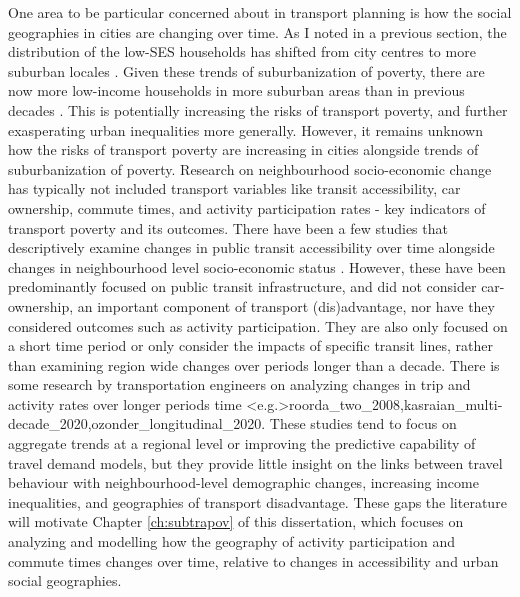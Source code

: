 One area to be particular concerned about in transport planning is how the social geographies in cities are changing over time. As I noted in a previous section, the distribution of the low-SES households has shifted from city centres to more suburban locales \cite{ehrenhalt_great_2012,ades_are_2012}. Given these trends of suburbanization of poverty, there are now more low-income households in more suburban areas than in previous decades \cite{ades_are_2012,ades_is_2016,breau_pulling_2018}. This is potentially increasing the risks of transport poverty, and further exasperating urban inequalities more generally. However, it remains unknown how the risks of transport poverty are increasing in cities alongside trends of suburbanization of poverty. Research on neighbourhood socio-economic change has typically not included transport variables like transit accessibility, car ownership, commute times, and activity participation rates - key indicators of transport poverty and its outcomes. There have been a few studies that descriptively examine changes in public transit accessibility over time alongside changes in neighbourhood level socio-economic status . However, these have been predominantly focused on public transit infrastructure, and did not consider car-ownership, an important component of transport (dis)advantage, nor have they considered outcomes such as activity participation. They are also only focused on a short time period or only consider the impacts of specific transit lines, rather than examining region wide changes over periods longer than a decade. There is some research by transportation engineers on analyzing changes in trip and activity rates over longer periods time \shortcite<e.g.>{roorda_two_2008,kasraian_multi-decade_2020,ozonder_longitudinal_2020}. These studies tend to focus on aggregate trends at a regional level or improving the predictive capability of travel demand models, but they provide little insight on the links between travel behaviour with neighbourhood-level demographic changes, increasing income inequalities, and geographies of transport disadvantage. These gaps the literature will motivate Chapter \ref{ch:subtrapov} of this dissertation, which focuses on analyzing and modelling how the geography of activity participation and commute times changes over time, relative to changes in accessibility and urban social geographies.

